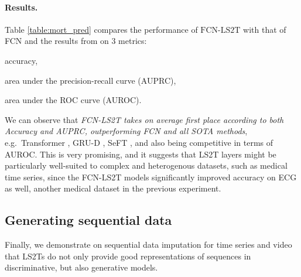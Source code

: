 \documentclass{article} \usepackage{iclr2021_conference,times}
\theoremstyle{plain}
\theoremstyle{definition}
\begin{document}
\paragraph{Results.} Table \ref{table:mort_pred} compares the performance of $\text{FCN-LS2T}$ with that of FCN and the results from \cite{horn2020set} on 3 metrics: \begin{enumerate*}[label=(\arabic*)] \item {\sc accuracy}, \item area under the precision-recall curve ({\sc AUPRC}), \item area under the ROC curve ({\sc AUROC}). 
\end{enumerate*} We can observe that \emph{FCN-LS2T takes on average first place according to both {\sc Accuracy} and {\sc AUPRC}, outperforming FCN and all SOTA methods}, e.g.~{\sc Transformer} \citep{vaswani2017attention}, {\sc GRU-D} \cite{che2018recurrent}, {\sc SeFT} \citep{horn2020set}, and also being competitive in terms of {\sc AUROC}. This is very promising, and it suggests that LS2T layers might be particularly well-suited to complex and heterogenous datasets, such as medical time series, since the FCN-LS2T models significantly improved accuracy on {\sc ECG} as well, another medical dataset in the previous experiment.



\subsection{Generating sequential data} \label{subseq:4_gpvae}
Finally, we demonstrate on sequential data imputation for time series and video that LS2Ts do not only provide good representations of sequences in discriminative, but also generative models.
\end{document}
